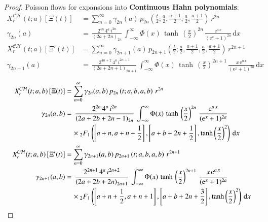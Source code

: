 \documentclass[a4paper,11pt,twoside]{amsart}
\newcommand{\verifiedeq}{=}
\newcommand{\verifiedeq}{\stackrel{\checkmark}{=}}
\begin{document}
\begin{proof}
Poisson flows for expansions into \textbf{Continuous Hahn polynomials}:
\begin{align}
 X^\mathcal{CH}_r(t;a)\left[\Xi(t)\right] &\verifiedeq \sum_{n=0}^\infty \gamma_{2n}(a)\,p_{2n}\left(\frac{t}{2};\frac{a}{2},\frac{a+1}{2},\frac{a}{2},\frac{a+1}{2}\right)\, r^{2n} \\
\gamma_{2n}(a) &\verifiedeq \,\frac{2^{4n}\,4^a\,i^{2n}}{(2a+2n)_{2n}} \,\int_{-\infty}^{\infty} \Phi(x)\,\tanh\,\left(\frac{x}{2}\right)^{2n}\,\frac{\textrm{e}^{a\,x}}{(\textrm{e}^{x}+1)^{2a}}\,\mathrm{d}x\\
 X^\mathcal{CH}_r(t;a)\left[\Xi'(t)\right] &\verifiedeq \sum_{n=0}^\infty \gamma_{2n+1}(a)\,p_{2n+1}\left(\frac{t}{2};\frac{a}{2},\frac{a+1}{2},\frac{a}{2},\frac{a+1}{2}\right)\, r^{2n+1} \\
\gamma_{2n+1}(a) &\verifiedeq \,\frac{2^{4n+2}\,4^a\,i^{2n+1}}{(2a+2n+1)_{2n+1}} \,\int_{-\infty}^{\infty} \Phi(x)\,\tanh\,\left(\frac{x}{2}\right)^{2n+1}\,\frac{x\,\textrm{e}^{a\,x}}{(\textrm{e}^{x}+1)^{2a}}\,\mathrm{d}x
\end{align} 

\begin{align}
 X^\mathcal{CH}_r(t;a,b)\left[\Xi(t)\right] &\verifiedeq \sum_{n=0}^\infty \gamma_{2n}(a,b)\,p_{2n}\left(t;a,b,a,b\right)\, r^{2n} \\
\gamma_{2n}(a,b) &\verifiedeq \,\frac{2^{2n}\,4^a\,i^{2n}}{\left(2a+2b+2n-1\right)_{2n}} \,\int_{-\infty}^{\infty} \Phi(x)\,\tanh\,\left(\frac{x}{2}\right)^{2n}\,\frac{\textrm{e}^{a\,x}}{(\textrm{e}^{x}+1)^{2a}}\\ &\quad \times{}_2F_1\left(\left[a+n, a+n+\frac12\right],\left[a+b+2n+\frac12\right],\tanh\left(\frac{x}{2}\right)^2\right)\,\mathrm{d}x \notag\\
 X^\mathcal{CH}_r(t;a,b)\left[\Xi'(t)\right] &\verifiedeq \sum_{n=0}^\infty \gamma_{2n+1}(a,b)\,p_{2n+1}\left(t;a,b,a,b\right)\, r^{2n+1} \\
\gamma_{2n+1}(a,b) &\verifiedeq \,\frac{2^{2n+1}\,4^a\,i^{2n+2}}{\left(2a+2b+2n\right)_{2n+1}} \,\int_{-\infty}^{\infty} \Phi(x)\,\tanh\,\left(\frac{x}{2}\right)^{2n+1}\,\frac{x\,\textrm{e}^{a\,x}}{(\textrm{e}^{x}+1)^{2a}}\\ &\quad \times{}_2F_1\left(\left[a+n+\frac12, a+n+1\right],\left[a+b+2n+\frac32\right],\tanh\left(\frac{x}{2}\right)^2\right)\,\mathrm{d}x \notag
\end{align} 


\end{proof}
\end{document}
